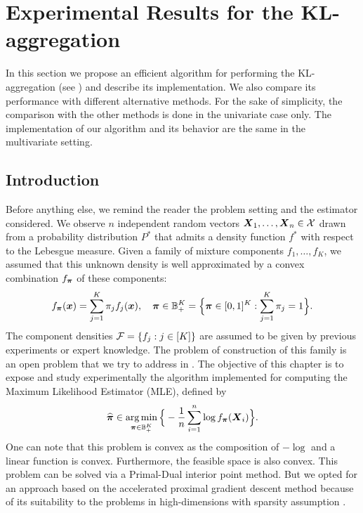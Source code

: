 
\chapter[Experiments for the KL-aggregation]{Experimental Results for the KL-aggregation}\label{chap:exp_kl_aggreg}
\minitoc
In this section we propose an efficient algorithm for performing the KL-aggregation (see ) and describe its implementation. We also compare its performance with different alternative methods. For the sake of simplicity, the comparison with the other methods is done in the univariate case only. The implementation of our algorithm and its behavior are the same in the multivariate setting.

\section{Introduction}


Before anything else, we remind the reader the problem setting and the estimator considered. We observe $n$ independent random vectors $\boldsymbol X_1,\ldots,\boldsymbol X_n\in\mathcal X$ drawn from a probability distribution $P^*$ that admits a density function $f^*$ with respect to the Lebesgue measure. Given a family of mixture components $f_1,\ldots,f_K$, we assumed that this unknown density is well approximated by a convex combination $f_{\boldsymbol \pi}$ of these components:
\begin{equation}
f_{\boldsymbol \pi}(\boldsymbol x)=\sum_{j=1}^K\pi_j f_j(\boldsymbol x), \quad \boldsymbol \pi \in {\mathbb B}_+^K=\Big\{\boldsymbol \pi\in [0,1]^K: \sum_{j=1}^K\pi_j=1\Big\}.
\end{equation}
The component densities $\mathcal F=\{f_j:j\in[K]\}$ are assumed to be given by previous experiments or expert knowledge. The problem of construction of this family is an open problem that we try to address in . The objective of this chapter is to expose and study experimentally the algorithm implemented for computing the Maximum Likelihood Estimator (MLE), defined by
\begin{equation}
\label{MLE_2}
\widehat{\boldsymbol \pi} \in \operatorname*{arg\,min}_{\boldsymbol \pi\in {\mathbb B}_+^K}\Big\{-\frac{1}{n}\sum_{i=1}^n\log f_{\boldsymbol \pi}(\boldsymbol X_i)\Big\}.
\end{equation}
One can note that this problem is convex as the composition of $-\log$ and a linear function is convex. Furthermore, the feasible space is also convex. This problem can be solved via a Primal-Dual interior point method. But we opted for an approach based on the accelerated proximal gradient descent method because of its suitability to the problems in high-dimensions with sparsity assumption \citep{Beck:2009:FIS:1658360.1658364}.

